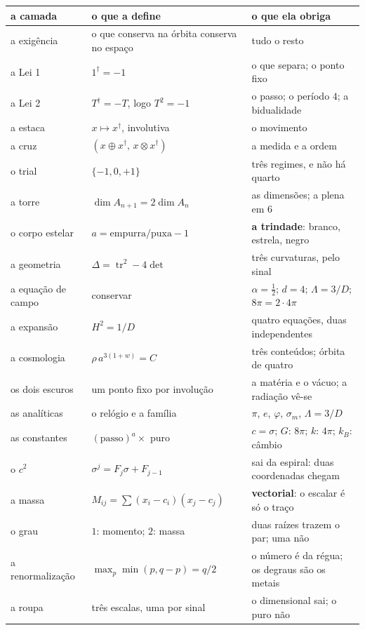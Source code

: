\documentclass[11pt,a4paper]{article}
\newcommand{\dg}{^{\dagger}}
\begin{document}
\begin{center}\footnotesize
\setlength\tabcolsep{4pt}
\setlength\tabcolsep{4pt}
\begin{tabular}{@{}p{3.1cm}p{4.4cm}p{7.4cm}@{}}
\toprule
a camada & o que a define & o que ela obriga \\
\midrule
a exigência & o que conserva na órbita conserva no espaço & tudo o resto \\
a Lei 1 & $1\dg=-1$ & o que separa; o ponto fixo \\
a Lei 2 & $T\dg=-T$, logo $T^2=-1$ & o passo; o período $4$; a bidualidade \\
a estaca & $x\mapsto x\dg$, involutiva & o movimento \\
a cruz & $(x\oplus x\dg,\,x\otimes x\dg)$ & a medida e a ordem \\
o trial & $\{-1,0,+1\}$ & três regimes, e não há quarto \\
a torre & $\dim A_{n+1}=2\dim A_n$ & as dimensões; a plena em $6$ \\
o corpo estelar & $a=\text{empurra}/\text{puxa}-1$ & \textbf{a trindade}: branco, estrela, negro \\
a geometria & $\Delta=\operatorname{tr}^2-4\det$ & três curvaturas, pelo sinal \\
a equação de campo & conservar & $\alpha=\tfrac12$; $d=4$; $\Lambda=3/D$; $8\pi=2\cdot4\pi$ \\
a expansão & $H^2=1/D$ & quatro equações, duas independentes \\
a cosmologia & $\rho\,a^{3(1+w)}=C$ & três conteúdos; órbita de quatro \\
os dois escuros & um ponto fixo por involução & a matéria e o vácuo; a radiação vê-se \\
as analíticas & o relógio e a família & $\pi$, $e$, $\varphi$, $\sigma_m$, $\Lambda=3/D$ \\
as constantes & $(\text{passo})^a\times$ puro & $c=\sigma$; $G$: $8\pi$; $k$: $4\pi$; $k_B$: câmbio \\
o $c^2$ & $\sigma^j=F_j\sigma+F_{j-1}$ & sai da espiral: duas coordenadas chegam \\
a massa & $M_{ij}=\sum(x_i-c_i)(x_j-c_j)$ & \textbf{vectorial}: o escalar é só o traço \\
o grau & $1$: momento; $2$: massa & duas raízes trazem o par; uma não \\
a renormalização & $\max_p\min(p,q-p)=q/2$ & o número é da régua; os degraus são os metais \\
a roupa & três escalas, uma por sinal & o dimensional sai; o puro não \\

\end{tabular}
\end{center}
\end{document}
